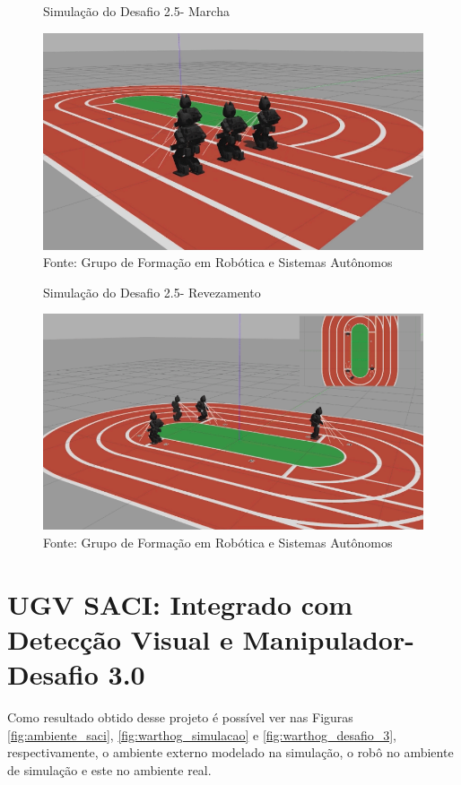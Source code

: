 \begin{figure}[H]
    \caption{Simulação do Desafio 2.5- Marcha}
    \centering
    \includegraphics[width= \textwidth]{Figures/marcha.png}
    \caption*{Fonte: Grupo de Formação em Robótica e Sistemas Autônomos}
    \label{fig:marcha_darwinop}
\end{figure}



\begin{figure}[H]
    \caption{Simulação do Desafio 2.5- Revezamento}
    \centering
    \includegraphics[width= \textwidth]{Figures/revezamento.png}
    \caption*{Fonte: Grupo de Formação em Robótica e Sistemas Autônomos}
    \label{fig:revezamento_darwinop}
\end{figure}

\section{UGV SACI: Integrado com Detecção Visual e Manipulador- Desafio 3.0}
\label{sec:desafio_3_0}
Como resultado obtido desse projeto é possível ver nas Figuras \ref{fig:ambiente_saci}, \ref{fig:warthog_simulacao} e \ref{fig:warthog_desafio_3}, respectivamente, o ambiente externo modelado na simulação, o robô no ambiente de simulação e este no ambiente real.


